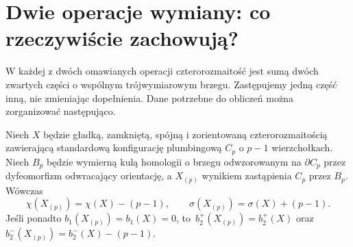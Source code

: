 \section{Dwie operacje wymiany: co rzeczywiście zachowują?}
\label{sec:tg-syn-exchange}

W każdej z dwóch omawianych operacji czterorozmaitość
jest sumą dwóch zwartych części o wspólnym trójwymiarowym
brzegu. Zastępujemy jedną część inną, nie zmieniając dopełnienia.
Dane potrzebne do obliczeń można zorganizować następująco.

\begin{center}
\end{center}

\begin{twierdzenie}
\label{thm:tg-syn-rational}
Niech $X$ będzie gładką, zamkniętą, spójną i zorientowaną
czterorozmaitością zawierającą standardową konfigurację
plumbingową $C_p$ o $p-1$ wierzchołkach. Niech $B_p$
będzie wymierną kulą homologii o brzegu odwzorowanym na
$\partial C_p$ przez dyfeomorfizm odwracający orientację,
a $X_{(p)}$ wynikiem zastąpienia $C_p$ przez $B_p$.
Wówczas
\[
 \chi(X_{(p)})=\chi(X)-(p-1),\qquad
 \sigma(X_{(p)})=\sigma(X)+(p-1).
\]
Jeśli ponadto $b_1(X_{(p)})=b_1(X)=0$, to
$\,b_2^+(X_{(p)})=b_2^+(X)$ oraz
$b_2^-(X_{(p)})=b_2^-(X)-(p-1)$.
\end{twierdzenie}

